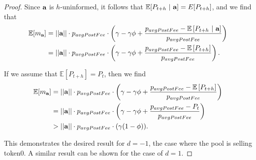 \begin{proof}
    
        Since $\textbf a$ is $h$-uninformed, it follows that $\mathbb E[P_{t+h} \ | \ \textbf a] = E[P_{t+h}]$, and we find that
            \begin{align*}
                \mathbb E[m_\textbf a]
                    & = ||\textbf{a}|| \cdot p_{avgPostFee} \cdot \left( \gamma - \gamma \phi + \frac{p_{avgPostFee} - \mathbb E \left[P_{t+h} \ | \ \textbf a \right]}{p_{avgPostFee}} \right) \\
                    & = ||\textbf{a}|| \cdot p_{avgPostFee} \cdot \left( \gamma - \gamma \phi + \frac{p_{avgPostFee} - \mathbb E \left[ P_{t+h} \right]}{p_{avgPostFee}} \right).
            \end{align*}

        If we assume that $\mathbb E[P_{t+h}] = P_t$, then we find 
            \begin{align*}
                \mathbb E[m_\textbf a]
                    & = ||\textbf{a}|| \cdot p_{avgPostFee} \cdot \left( \gamma - \gamma \phi + \frac{p_{avgPostFee} - \mathbb E \left[ P_{t+h} \right]}{p_{avgPostFee}} \right) \\
                    & = ||\textbf{a}|| \cdot p_{avgPostFee} \cdot \left( \gamma - \gamma \phi + \frac{p_{avgPostFee} - P_t}{p_{avgPostFee}} \right) \\
                    & > ||\textbf{a}|| \cdot p_{avgPostFee} \cdot (\gamma(1-\phi)).
            \end{align*}

        This demonstrates the desired result for $d=-1$, the case where the pool is selling token0. A similar result can be shown for the case of $d=1$.
    \end{proof}

    
